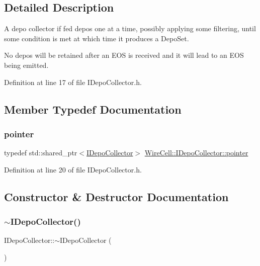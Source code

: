\subsection{Detailed Description}
A depo collector if fed depos one at a time, possibly applying some filtering, until some condition is met at which time it produces a Depo\+Set.

No depos will be retained after an E\+OS is received and it will lead to an E\+OS being emitted. 

Definition at line 17 of file I\+Depo\+Collector.\+h.



\subsection{Member Typedef Documentation}
\mbox{\label{class_wire_cell_1_1_i_depo_collector_a90a08b7b30e80a1a2d5ce1367cc2d698}} 
\subsubsection{\texorpdfstring{pointer}{pointer}}
{\footnotesize\ttfamily typedef std\+::shared\+\_\+ptr$<$\hyperlink{class_wire_cell_1_1_i_depo_collector}{I\+Depo\+Collector}$>$ \hyperlink{class_wire_cell_1_1_i_depo_collector_a90a08b7b30e80a1a2d5ce1367cc2d698}{Wire\+Cell\+::\+I\+Depo\+Collector\+::pointer}}



Definition at line 20 of file I\+Depo\+Collector.\+h.



\subsection{Constructor \& Destructor Documentation}
\mbox{\label{class_wire_cell_1_1_i_depo_collector_a3200cc7cb980eddbffc4bd7fa3ebb11d}} 
\subsubsection{\texorpdfstring{$\sim$\+I\+Depo\+Collector()}{~IDepoCollector()}}
{\footnotesize\ttfamily I\+Depo\+Collector\+::$\sim$\+I\+Depo\+Collector (\begin{DoxyParamCaption}{ }\end{DoxyParamCaption})\hspace{0.3cm}{\ttfamily [virtual]}}



